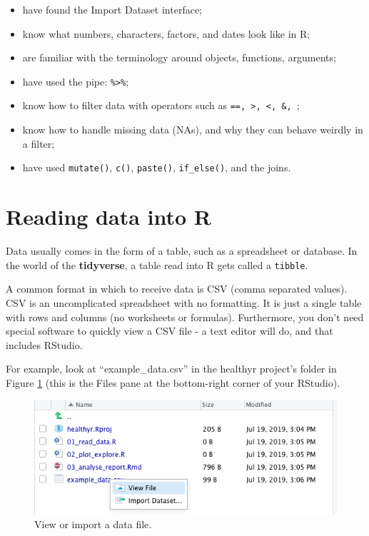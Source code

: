 \documentclass[
  12pt,
  krantz2]{krantz}
\providecommand{\tightlist}{%
  \setlength{\itemsep}{0pt}\setlength{\parskip}{0pt}}
\begin{document}
\begin{itemize}
\tightlist
\item
  have found the Import Dataset interface;
\item
  know what numbers, characters, factors, and dates look like in R;
\item
  are familiar with the terminology around objects, functions, arguments;
\item
  have used the pipe: \texttt{\%\textgreater{}\%};
\item
  know how to filter data with operators such as \texttt{==,\ \textgreater{},\ \textless{},\ \&,\ \textbar{}};
\item
  know how to handle missing data (NAs), and why they can behave weirdly in a filter;
\item
  have used \texttt{mutate()}, \texttt{c()}, \texttt{paste()}, \texttt{if\_else()}, and the joins.
\end{itemize}

\hypertarget{chap02-h2-reading-data-into-r}{%
\section{Reading data into R}\label{chap02-h2-reading-data-into-r}}


Data usually comes in the form of a table, such as a spreadsheet or database.
In the world of the \textbf{tidyverse}, a table read into R gets called a \texttt{tibble}.

A common format in which to receive data is CSV (comma separated values).
CSV is an uncomplicated spreadsheet with no formatting.
It is just a single table with rows and columns (no worksheets or formulas).
Furthermore, you don't need special software to quickly view a CSV file - a text editor will do, and that includes RStudio.

For example, look at ``example\_data.csv'' in the healthyr project's folder in Figure \ref{fig:chap2-fig-examplecsv} (this is the Files pane at the bottom-right corner of your RStudio).

\begin{figure}

{\centering \includegraphics[width=0.7\linewidth]{images/chapter02/files_csv_example} 

}

\caption{View or import a data file.}\label{fig:chap2-fig-examplecsv}
\end{figure}
\end{document}
